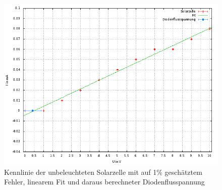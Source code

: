 \begin{figure}
\includegraphics[scale=0.6]{Auswertung/Solar.png}
\caption{Kennlinie der unbeleuchteten Solarzelle mit auf 1\% geschätztem Fehler, linearem Fit und daraus berechneter Diodenflusspannung}
\label{solar}
\end{figure}

